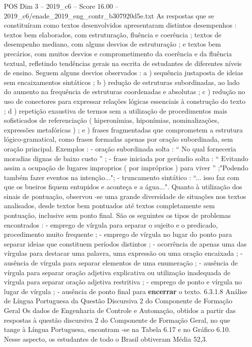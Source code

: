 \begin{textsample}{POS Dim 3 – 2019\_c6 – Score 16.00 – 2019\_c6/enade\_2019\_eng\_contr\_b307920d5e.txt}
As respostas que se constituíram como textos desenvolvidos apresentaram distintos desempenhos : textos bem elaborados, com estruturação, fluência e coerência ; textos de desempenho mediano, com alguns desvios de estruturação ; e textos bem precários, com muitos desvios e comprometimento da coerência e da fluência textual, refletindo tendências gerais na escrita de estudantes de diferentes níveis de ensino.
Seguem alguns desvios observados : a ) sequência justaposta de ideias sem encaixamentos sintáticos ; b ) redução de estruturas subordinadas, ao lado do aumento na frequência de estruturas coordenadas e absolutas ; c ) redução no uso de conectores para expressar relações lógicas essenciais à construção do texto ; d ) repetição exaustiva de termos sem a utilização de procedimentos mais sofisticados de referenciação ( hiperonímias, hiponímias, nominalizações, expressões metafóricas ) ; e ) frases fragmentadas que comprometem a estrutura lógico-gramatical, como frases formadas apenas por oração subordinada, sem oração principal.
Exemplos : - oração subordinada solta : “ No qual forneceria moradias dignas de baixo custo ” ; - frase iniciada por gerúndio solta : “ Evitando assim a ocupação de lugares improprios ( por impróprios ) para viver ” ;"Podendo também fazer eventos na intenção..."; - truncamento sintático : “... isso faz com que os bueiros fiquem entupidos e aconteça e a água...".
Quanto à utilização dos sinais de pontuação, observou -se uma grande diversidade de situações nos textos analisados, desde textos bem pontuados até textos completamente sem pontuação, inclusive sem ponto final.
São os seguintes os tipos de problemas encontrados : - emprego de vírgula para separar o sujeito e o predicado, procedimento muito frequente ; - emprego de vírgula no lugar do ponto para separar ideias que constituem períodos distintos ; - ocorrência de apenas uma das vírgulas para destacar uma palavra, uma expressão ou uma oração encaixada ; - ausência de vírgula para separar elementos de uma enumeração ; - ausência de vírgula para separar oração adjetiva explicativa ou utilização inadequada de vírgula para separar oração adjetiva restritiva ; - emprego de ponto e vírgula no lugar de vírgula ; - ausência de ponto final para \textbf{encerrar} o texto. 6.3.1.8 Análise de Língua Portuguesa da Questão Discursiva 2 do Componente de Formação Geral Os dados de Engenharia de Controle e Automação, obtidos a partir das respostas à questão discursiva 2 do Componente de Formação Geral, no que tange à Língua Portuguesa, encontram -se na Tabela 6.17 e no Gráfico 6.10.
Nesse aspecto, os estudantes de todo o Brasil obtiveram Média 52,3.

\end{textsample}
